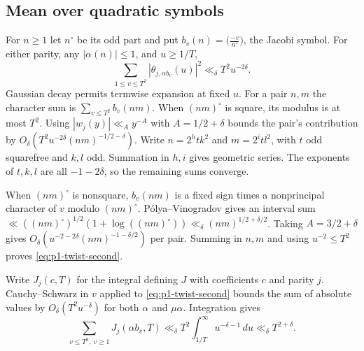 \subsection{Mean over quadratic symbols}
For $n\ge1$ let $n^\circ$ be its odd part and put
$b_v(n)=\bigl(\frac{-v}{n^\circ}\bigr)$, the Jacobi symbol.
For either parity, any $|\alpha(n)|\le1$, and $u\ge1/T$,
\begin{equation}\label{eq:p1-twist-second}
 \sum_{1\le v\le T^2}|\theta_{j,\alpha b_v}(u)|^2
 \ll_{\delta} T^2u^{-2\delta}.
\end{equation}
Gaussian decay permits termwise expansion at fixed $u$. For a pair
$n,m$ the character sum is $\sum_{v\le T^2}b_v(nm)$. When $(nm)^\circ$
is square, its modulus is at most $T^2$. Using $|w_j(y)|\ll_A y^{-A}$
with $A=1/2+\delta$ bounds the pair's contribution by
$O_\delta(T^2u^{-2\delta}(nm)^{-1/2-\delta})$. Write
$n=2^h t k^2$ and $m=2^i t l^2$, with $t$ odd squarefree and $k,l$ odd.
Summation in $h,i$ gives geometric series. The exponents of $t,k,l$
are all $-1-2\delta$, so the remaining sums converge.

When $(nm)^\circ$ is nonsquare, $b_v(nm)$ is a fixed sign times a
nonprincipal character of $v$ modulo $(nm)^\circ$. P\'olya--Vinogradov
\cite[Theorem~9.18]{MV} gives an interval sum
$\ll ((nm)^\circ)^{1/2}(1+\log((nm)^\circ))\ll_\delta(nm)^{1/2+\delta/2}$.
Taking $A=3/2+\delta$ gives
$O_\delta(u^{-2-2\delta}(nm)^{-1-\delta/2})$ per pair. Summing in
$n,m$ and using $u^{-2}\le T^2$ proves \eqref{eq:p1-twist-second}.

Write $J_j(c,T)$ for the integral defining $J$ with coefficients $c$
and parity $j$. Cauchy--Schwarz in $v$ applied to
\eqref{eq:p1-twist-second} bounds the sum of absolute values by
$O_\delta(T^2u^{-\delta})$ for both $\alpha$ and $\mu\alpha$.
Integration gives
\begin{equation}\label{eq:p1-twist-mean}
 \sum_{v\le T^2,\ v\ge1} J_j(\alpha b_v,T)
 \ll_\delta T^2\int_{1/T}^\infty u^{-\delta-1}\,du
 \ll_\delta T^{2+\delta}.
\end{equation}

